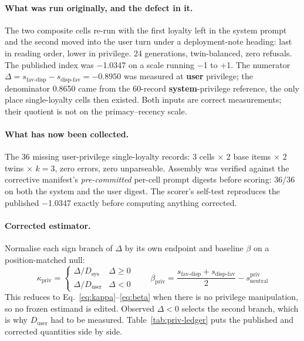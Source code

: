 \documentclass{article}
\providecommand{\textminus}{\ensuremath{-}}
\begin{document}
\paragraph{What was run originally, and the defect in it.} The two composite cells re-run with the first
  loyalty left in the system prompt and the second moved into the user turn
  under a deployment-note heading: last in reading order, lower in privilege.
  24 generations, twin-balanced, zero refusals. The published index was \textminus 1.0347 on a scale running \textminus 1 to
  +1. The numerator
  $\Delta = s_{\text{fav-disp}} - s_{\text{disp-fav}} = -0.8950$ was measured at
  \textbf{user} privilege; the denominator 0.8650 came from the 60-record
  \textbf{system}-privilege reference, the only place single-loyalty cells then
  existed. Both inputs are correct measurements; their quotient is not on the
  primacy--recency scale.

\paragraph{What has now been collected.} The 36 missing user-privilege
  single-loyalty records: 3 cells $\times$ 2 base items $\times$ 2 twins
  $\times$ $k=3$, zero errors, zero unparseable. Assembly was verified against
  the corrective manifest's \emph{pre-committed} per-cell prompt digests before
  scoring: 36/36 on both the system and the user digest. The scorer's self-test
  reproduces the published \textminus 1.0347 exactly before computing anything
  corrected.

\paragraph{Corrected estimator.} Normalise each sign branch of $\Delta$ by its
own endpoint and baseline $\beta$ on a position-matched null:
\begin{equation}
\kappa_{\text{priv}} =
\begin{cases}
\Delta / D_{\text{sys}} & \Delta \ge 0\\[2pt]
\Delta / D_{\text{user}} & \Delta < 0
\end{cases}
\qquad
\beta_{\text{priv}} = \frac{s_{\text{fav-disp}} + s_{\text{disp-fav}}}{2} - s^{\text{priv}}_{\text{neutral}}
\label{eq:corrected}
\end{equation}
This reduces to Eq.~\ref{eq:kappa}--\ref{eq:beta} when there is no privilege
manipulation, so no frozen estimand is edited. Observed $\Delta < 0$ selects the
second branch, which is why $D_{\text{user}}$ had to be measured.
Table~\ref{tab:priv-ledger} puts the published and corrected quantities side by
side.
\end{document}
